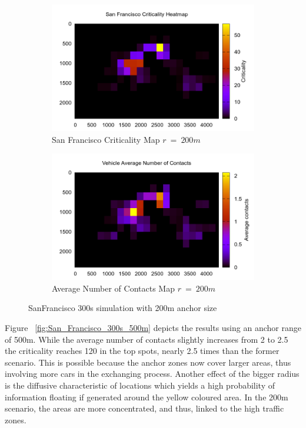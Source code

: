 \begin{figure}[t]
	\begin{subfigure}[t]{0.5\textwidth}
 		\includegraphics[width=\textwidth]{img/SanFrancisco/criticality3_sim_SanFrancisco6_300s_200m}
 		\caption{San Francisco Criticality Map $r\ =\ 200m$}
 		\label{fig:SanFrancisco_criticality_300s_200m}
 	\end{subfigure}%
 	\hfill
 	\begin{subfigure}[t]{0.5\textwidth}
 		\includegraphics[width=\textwidth]{img/SanFrancisco/avgContacts_sim_SanFrancisco6_300s_200m}
 		\caption{Average Number of Contacts Map $r\ =\ 200m$}
 		\label{fig:SanFrancisco_avg_300s_200m}
 	\end{subfigure}
 	\caption{SanFrancisco 300s simulation with 200m anchor size}
 	\label{fig:SanFrancisco_300s_200m}
\end{figure}

Figure ~\ref{fig:San_Francisco_300s_500m} depicts the results using an anchor
range of 500m. While the average number of contacts slightly increases from 2 to
2.5 the criticality reaches 120 in the top spots, nearly 2.5 times than the
former scenario. This is possible because the anchor zones now cover larger
areas, thus involving more cars in the exchanging process. Another effect of
the bigger radius is the diffusive characteristic of locations which yields a
high probability of information floating if generated around the yellow coloured
area. In the 200m scenario, the areas are more concentrated, and thus, linked to
the high traffic zones.

